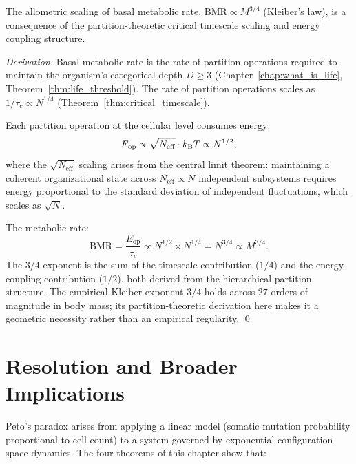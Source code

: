 \begin{proposition}
\label{prop:kleiber}
The allometric scaling of basal metabolic rate, $\mathrm{BMR} \propto M^{3/4}$
(Kleiber's law), is a consequence of the partition-theoretic critical timescale
scaling and energy coupling structure.
\end{proposition}

\begin{proof}[Derivation]
Basal metabolic rate is the rate of partition operations required to maintain
the organism's categorical depth $D \geq 3$ (Chapter~\ref{chap:what_is_life},
Theorem~\ref{thm:life_threshold}). The rate of partition operations scales as
$1/\tau_c \propto N^{1/4}$ (Theorem~\ref{thm:critical_timescale}).

Each partition operation at the cellular level consumes energy:
\begin{equation}
  E_{\mathrm{op}} \propto \sqrt{N_{\mathrm{eff}}} \cdot k_{\mathrm{B}} T \propto N^{1/2},
\end{equation}
where the $\sqrt{N_{\mathrm{eff}}}$ scaling arises from the central limit theorem:
maintaining a coherent organizational state across $N_{\mathrm{eff}} \propto N$
independent subsystems requires energy proportional to the standard deviation
of independent fluctuations, which scales as $\sqrt{N}$.

The metabolic rate:
\begin{equation}
  \mathrm{BMR} = \frac{E_{\mathrm{op}}}{\tau_c} \propto N^{1/2} \times N^{1/4} = N^{3/4} \propto M^{3/4}.
\end{equation}
The $3/4$ exponent is the sum of the timescale contribution ($1/4$) and the
energy-coupling contribution ($1/2$), both derived from the hierarchical partition
structure. The empirical Kleiber exponent $3/4$ holds across 27 orders of
magnitude in body mass; its partition-theoretic derivation here makes it a
geometric necessity rather than an empirical regularity. \qed
\end{proof}

\section{Resolution and Broader Implications}
\label{sec:peto_resolution}

Peto's paradox arises from applying a linear model (somatic mutation probability
proportional to cell count) to a system governed by exponential configuration
space dynamics. The four theorems of this chapter show that:

